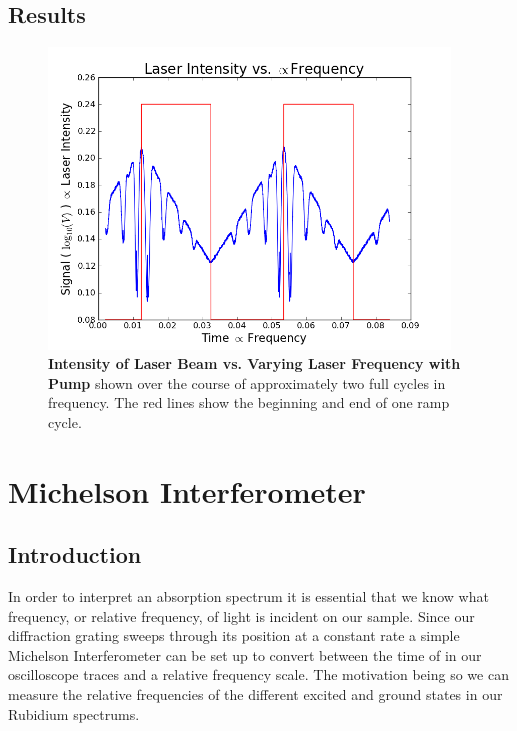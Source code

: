 \documentclass[paper=a4, fontsize=11pt]{scrartcl} %
\numberwithin{equation}{section}
\numberwithin{figure}{section}
\numberwithin{table}{section}
\begin{document}
\subsection{Results}
\begin{figure}[h] \begin{center}
  \includegraphics[height=80mm]{2-2-002.png}
  \caption{\textbf{Intensity of Laser Beam vs. Varying Laser Frequency
      with Pump}  shown over the course of approximately two full
    cycles in frequency. The red lines show the beginning and end of
    one ramp cycle.}
  \label{fig:absorb2}
\end{center} \end{figure}

\section{Michelson Interferometer}

\subsection{Introduction}

In order to interpret an absorption spectrum it is essential that we
know what frequency, or relative frequency, of light is incident on
our sample. Since our diffraction grating sweeps through its position
at a constant rate a simple Michelson Interferometer can be set up to
convert between the time of in our oscilloscope traces and a relative
frequency scale. The motivation being so we can measure the relative
frequencies of the different excited and ground states in our Rubidium
spectrums.
\end{document}
